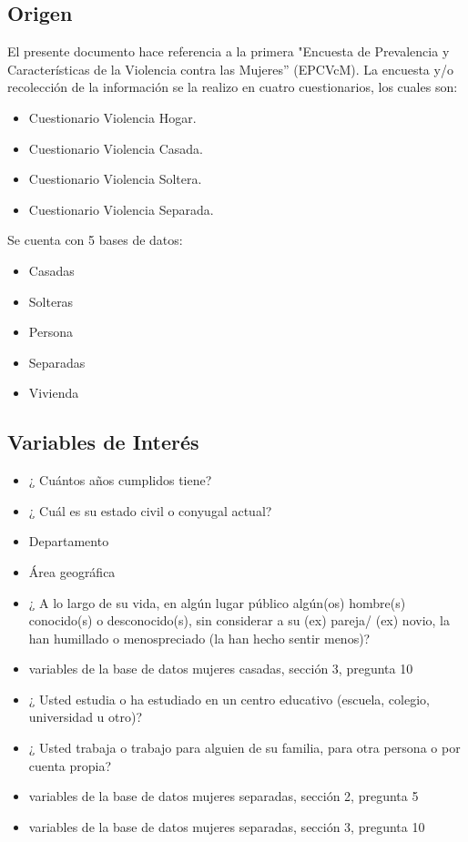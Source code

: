 \subsection{Origen}
El presente documento hace referencia a la primera "Encuesta de Prevalencia y Características de la Violencia contra las Mujeres'' (EPCVcM).
La encuesta y/o recolección de la información se la realizo en cuatro cuestionarios, los cuales son:
\begin{itemize}
\item	Cuestionario Violencia Hogar.
\item   Cuestionario Violencia Casada.
\item   Cuestionario Violencia Soltera.
\item   Cuestionario Violencia Separada.
\end{itemize}
Se cuenta con 5 bases de datos:
\begin{itemize}
\item	Casadas
\item	Solteras
\item	Persona
\item	Separadas
\item	Vivienda
\end{itemize}

\subsection{Variables de Interés}
\begin{itemize}
\item ¿ Cuántos años cumplidos tiene?
\item ¿ Cuál es su estado civil o conyugal actual?
\item Departamento
\item Área geográfica
\item ¿ A lo largo de su vida, en algún lugar público algún(os) hombre(s) conocido(s) o desconocido(s), sin considerar a su (ex) pareja/ (ex) novio, la han humillado o menospreciado (la han hecho sentir menos)?
\item variables de la base de datos mujeres casadas, sección 3, pregunta 10
\item ¿ Usted estudia o ha estudiado en un centro educativo (escuela, colegio, universidad u otro)?
\item ¿ Usted trabaja o trabajo para alguien de su familia, para otra persona o por cuenta propia?
\item variables de la base de datos mujeres separadas, sección 2, pregunta 5
\item variables de la base de datos mujeres separadas, sección 3, pregunta 10
\end{itemize}

